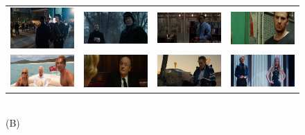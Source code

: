 \begin{figure}
\begin{center}
\begin{tabular}{cccc}
\includegraphics[width=0.15\linewidth]
  {fig/pos/09.jpg} 
& \includegraphics[width=0.15\linewidth]
  {fig/pos/04.jpg}  
& \includegraphics[width=0.15\linewidth]
  {fig/pos/15.jpg}   
& \includegraphics[width=0.15\linewidth]
  {fig/pos/10.jpg}
\\
\includegraphics[width=0.15\linewidth]
  {fig/pos/13.jpg} 
& \includegraphics[width=0.15\linewidth]
  {fig/pos/14.jpg}  
& \includegraphics[width=0.15\linewidth]
  {fig/pos/03.jpg}   
& \includegraphics[width=0.15\linewidth]
  {fig/pos/16.jpg}
\\
\end{tabular}
\\
\large{(B)}
\\
\bigskip


\end{center}
\end{figure}

